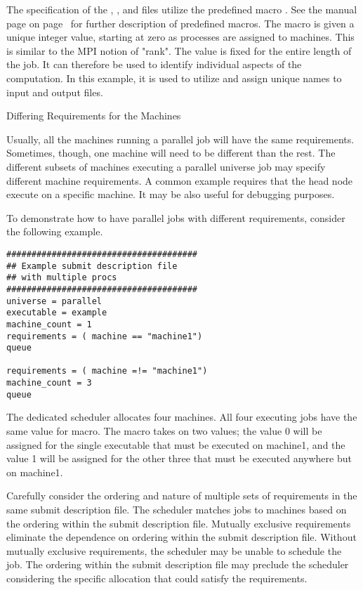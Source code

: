 The specification of the , ,
and  files utilize the predefined macro 
.
See the 
manual page on page~\pageref{man-condor-submit} for further
description of predefined macros.
The  macro is given a
unique integer value, starting at zero as processes are assigned to machines.
This is similar to the MPI notion of "rank".
The  value is fixed for the entire length of the job.
It can therefore be used to identify individual aspects of the computation.
In this example, it is used to utilize and assign unique names to
input and output files.

\begin{description}
\item[Differing Requirements for the Machines]
\end{description}

Usually, all the machines running a parallel job will have the
same requirements.  Sometimes, though, one machine will need
to be different than the rest.  
The different subsets of machines executing a parallel universe job
may specify different machine requirements.  A common example requires that the
head node execute on a specific machine.  It may be also useful for debugging purposes.

To demonstrate how to have parallel jobs with different requirements,
consider the following example.

\begin{verbatim}
######################################
## Example submit description file
## with multiple procs
######################################
universe = parallel
executable = example
machine_count = 1
requirements = ( machine == "machine1")
queue

requirements = ( machine =!= "machine1")
machine_count = 3
queue
\end{verbatim}

The dedicated scheduler allocates four machines.
All four executing jobs have the same value for 
macro.
The  macro takes on two values;
the value 0 will be assigned for the single executable
that must be executed on machine1, and
the value 1 will be assigned for the other three 
that must be executed anywhere but on machine1.

Carefully consider the ordering and nature of multiple
sets of requirements in the same submit description file.
The scheduler matches jobs to machines based on the ordering
within the submit description file.
Mutually exclusive requirements eliminate the dependence on
ordering within the submit description file.
Without mutually exclusive requirements,
the scheduler may be unable to schedule the job.
The ordering within the submit description file may preclude
the scheduler considering the specific allocation that
could satisfy the requirements.

